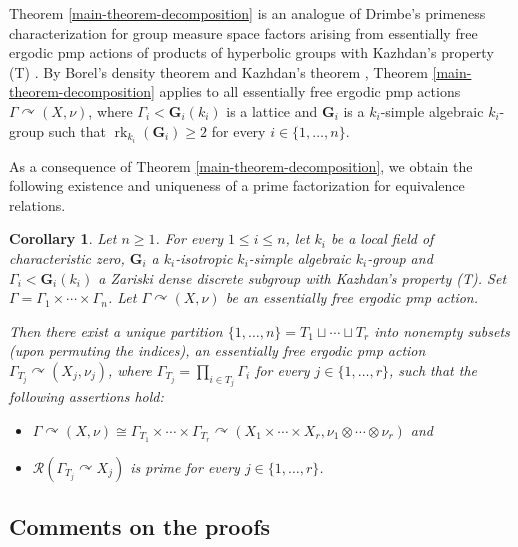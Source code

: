 \documentclass[11pt]{amsart}
\numberwithin{equation}{section}
\theoremstyle{plain}
\newtheorem{lettercor}[letterthm]{Corollary}
\theoremstyle{definition}
\newcommand{\rk}{\operatorname{rk}}
\begin{document}
Theorem \ref{main-theorem-decomposition} is an analogue of Drimbe's primeness characterization for group measure space factors arising from essentially free ergodic pmp actions of products of hyperbolic groups with Kazhdan's property (T) \cite{Dr19}. By Borel's density theorem \cite{Bo60} and Kazhdan's theorem \cite{Ka66}, Theorem \ref{main-theorem-decomposition} applies to all essentially free ergodic pmp actions $\Gamma \curvearrowright (X, \nu)$, where $\Gamma_i < \mathbf G_i(k_i)$ is a lattice and $\mathbf G_i$ is a $k_i$-simple algebraic $k_i$-group such that $\rk_{k_i}(\mathbf G_i) \geq 2$ for every $i \in \{1, \dots, n\}$. 

As a consequence of Theorem \ref{main-theorem-decomposition}, we obtain the following existence and uniqueness of a prime factorization for equivalence relations.

\begin{lettercor}\label{main-cor-decomposition}
Let $n \geq 1$. For every $1 \leq i \leq n$, let $k_i$ be a local field of characteristic zero, $\mathbf G_i$ a $k_i$-isotropic $k_i$-simple algebraic $k_i$-group and $\Gamma_i < \mathbf G_i(k_i)$ a Zariski dense discrete subgroup with Kazhdan's property {\em (T)}. Set $\Gamma = \Gamma_1 \times \cdots \times \Gamma_n$. Let $\Gamma \curvearrowright (X, \nu)$ be an essentially free ergodic pmp action.

Then there exist a unique partition $\{1, \dots, n\} = T_1 \sqcup \cdots \sqcup T_r$ into nonempty subsets (upon permuting the indices), an essentially free ergodic pmp action $\Gamma_{T_j} \curvearrowright (X_j, \nu_j)$, where $\Gamma_{T_j} = \prod_{i \in T_j} \Gamma_i$ for every $j \in \{1, \dots, r\}$, such that the following assertions hold:
\begin{itemize}
\item [$(\rm i)$] $\Gamma \curvearrowright (X, \nu) \cong \Gamma_{T_1} \times \cdots \times \Gamma_{T_r} \curvearrowright (X_1 \times \cdots \times X_r, \nu_1 \otimes \cdots \otimes \nu_r)$ and
\item [$(\rm ii)$] $\mathscr R(\Gamma_{T_j} \curvearrowright X_j)$ is prime for every $j \in \{1, \dots, r\}$.
\end{itemize}

\end{lettercor}



\subsection*{Comments on the proofs}
\end{document}
